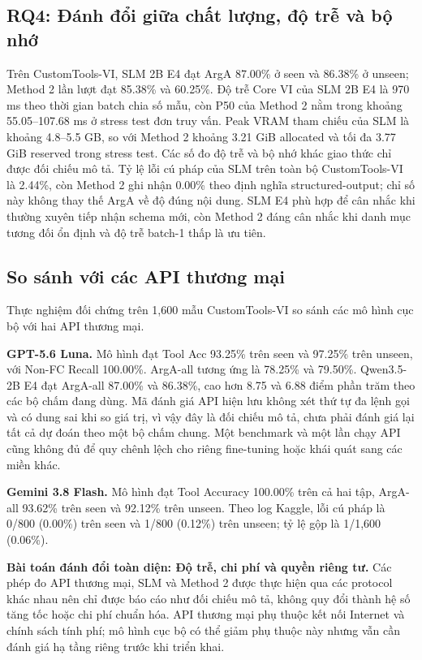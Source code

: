 \documentclass[10pt,twocolumn,a4paper]{article}
\begin{document}
\subsection{RQ4: Đánh đổi giữa chất lượng, độ trễ và bộ nhớ}

Trên CustomTools-VI, SLM 2B E4 đạt ArgA 87.00\% ở seen và 86.38\% ở unseen; Method 2 lần lượt đạt 85.38\% và 60.25\%. Độ trễ Core VI của SLM 2B E4 là 970 ms theo thời gian batch chia số mẫu, còn P50 của Method 2 nằm trong khoảng 55.05--107.68 ms ở stress test đơn truy vấn. Peak VRAM tham chiếu của SLM là khoảng 4.8--5.5 GB, so với Method 2 khoảng 3.21 GiB allocated và tối đa 3.77 GiB reserved trong stress test. Các số đo độ trễ và bộ nhớ khác giao thức chỉ được đối chiếu mô tả. Tỷ lệ lỗi cú pháp của SLM trên toàn bộ CustomTools-VI là 2.44\%, còn Method 2 ghi nhận 0.00\% theo định nghĩa structured-output; chỉ số này không thay thế ArgA về độ đúng nội dung. SLM E4 phù hợp để cân nhắc khi thường xuyên tiếp nhận schema mới, còn Method 2 đáng cân nhắc khi danh mục tương đối ổn định và độ trễ batch-1 thấp là ưu tiên.


\subsection{So sánh với các API thương mại}

Thực nghiệm đối chứng trên 1,600 mẫu CustomTools-VI so sánh các mô hình cục bộ với hai API thương mại.

\textbf{GPT-5.6 Luna.} Mô hình đạt Tool Acc 93.25\% trên seen và 97.25\% trên unseen, với Non-FC Recall 100.00\%. ArgA-all tương ứng là 78.25\% và 79.50\%. Qwen3.5-2B E4 đạt ArgA-all 87.00\% và 86.38\%, cao hơn 8.75 và 6.88 điểm phần trăm theo các bộ chấm đang dùng. Mã đánh giá API hiện lưu không xét thứ tự đa lệnh gọi và có dung sai khi so giá trị, vì vậy đây là đối chiếu mô tả, chưa phải đánh giá lại tất cả dự đoán theo một bộ chấm chung. Một benchmark và một lần chạy API cũng không đủ để quy chênh lệch cho riêng fine-tuning hoặc khái quát sang các miền khác.

\textbf{Gemini 3.8 Flash.} Mô hình đạt Tool Accuracy 100.00\% trên cả hai tập, ArgA-all 93.62\% trên seen và 92.12\% trên unseen. Theo log Kaggle, lỗi cú pháp là 0/800 (0.00\%) trên seen và 1/800 (0.12\%) trên unseen; tỷ lệ gộp là 1/1,600 (0.06\%).

\textbf{Bài toán đánh đổi toàn diện: Độ trễ, chi phí và quyền riêng tư.} Các phép đo API thương mại, SLM và Method 2 được thực hiện qua các protocol khác nhau nên chỉ được báo cáo như đối chiếu mô tả, không quy đổi thành hệ số tăng tốc hoặc chi phí chuẩn hóa. API thương mại phụ thuộc kết nối Internet và chính sách tính phí; mô hình cục bộ có thể giảm phụ thuộc này nhưng vẫn cần đánh giá hạ tầng riêng trước khi triển khai.
\end{document}
